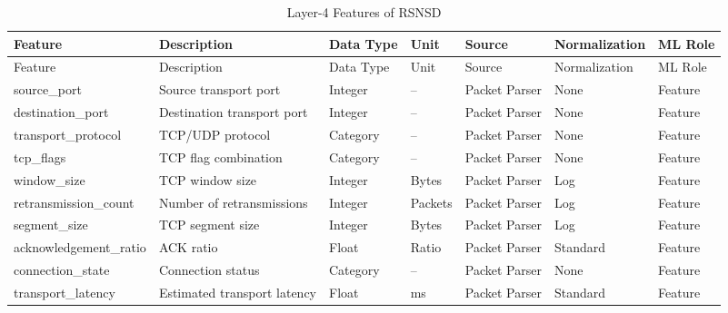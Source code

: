\documentclass[12pt,a4paper]{article}
\begin{document}
\begin{longtable}{p{3cm}p{5cm}p{2cm}p{1.5cm}p{2.3cm}p{2cm}p{2cm}}
	\caption{Layer-4 Features of RSNSD}
	\label{tab:l4_features}\\
	
	\toprule
	Feature & Description & Data Type & Unit & Source & Normalization & ML Role\\
	\midrule
	\endfirsthead
	
	\toprule
	Feature & Description & Data Type & Unit & Source & Normalization & ML Role\\
	\midrule
	\endhead
	
	source\_port & Source transport port & Integer & -- & Packet Parser & None & Feature\\
	destination\_port & Destination transport port & Integer & -- & Packet Parser & None & Feature\\
	transport\_protocol & TCP/UDP protocol & Category & -- & Packet Parser & None & Feature\\
	tcp\_flags & TCP flag combination & Category & -- & Packet Parser & None & Feature\\
	window\_size & TCP window size & Integer & Bytes & Packet Parser & Log & Feature\\
	retransmission\_count & Number of retransmissions & Integer & Packets & Packet Parser & Log & Feature\\
	segment\_size & TCP segment size & Integer & Bytes & Packet Parser & Log & Feature\\
	acknowledgement\_ratio & ACK ratio & Float & Ratio & Packet Parser & Standard & Feature\\
	connection\_state & Connection status & Category & -- & Packet Parser & None & Feature\\
	transport\_latency & Estimated transport latency & Float & ms & Packet Parser & Standard & Feature\\
	
	\bottomrule
\end{longtable}
\end{document}
